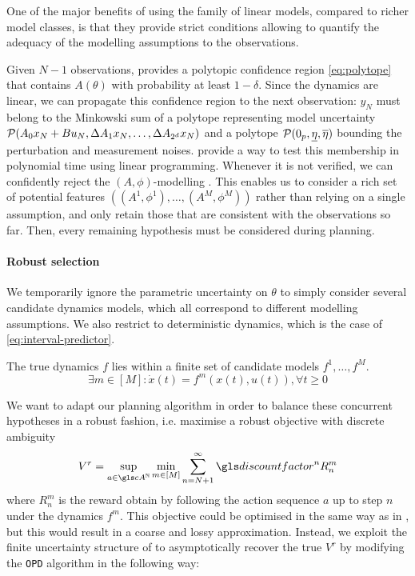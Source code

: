 One of the major benefits of using the family of linear models, compared to richer model classes, is that they provide strict conditions allowing to quantify the adequacy of the modelling assumptions to the observations.

Given $N-1$ observations,  provides a polytopic confidence region \eqref{eq:polytope} that contains $A(\theta)$ with probability at least $1-\delta$. Since the dynamics are linear, we can propagate this confidence region to the next observation: $y_{N}$ must belong to the Minkowski sum of a polytope representing model uncertainty $\mathcal{P}(A_{0} x_N + Bu_N, \Delta A_{1}x_N,\dots, \Delta A_{2^d}x_N)$ and a polytope $\mathcal{P}(0_p, \underline{\eta}, \overline{\eta})$ bounding the perturbation and measurement noises. \citet{delos2015} provide a way to test this membership in polynomial time using linear programming. Whenever it is not verified, we can confidently reject the $(A,\phi)$-modelling . This enables us to consider a rich set of potential features $\left((A^1, \phi^1), \dots, (A^M, \phi^M)\right)$ rather than relying on a single assumption, and only retain those that are consistent with the observations so far. Then, every remaining hypothesis must be considered during planning.

\paragraph{Robust selection}

We temporarily ignore the parametric uncertainty on $\theta$ to simply consider several candidate dynamics models, which all correspond to different modelling assumptions. We also restrict to deterministic dynamics, which is the case of \eqref{eq:interval-predictor}.

\begin{assumption}
	\label{assumpt:multi-model-ambiguity}
	\begin{leftbar}[assumptionbar]
	The true dynamics $f$ lies within a finite set of candidate models $f^1, \dots, f^M$.
	\begin{equation*}
	\exists m\in[M]: \dot{x}(t) = f^m(x(t), u(t)), \forall t\geq 0
	\end{equation*}
	\end{leftbar}
\end{assumption}
We want to adapt our planning algorithm in order to balance these concurrent hypotheses in a robust fashion, i.e. maximise a robust objective with discrete ambiguity
\begin{equation}
\label{eq:robust-objective-discrete}
V^r = \sup_{a\in\cA^\Natural}\min_{m\in[M]} \sum_{n=N+1}^\infty \discount^n R_n^m
\end{equation}
where $R_n^m$ is the reward obtain by following the action sequence $a$ up to step $n$ under the dynamics $f^m$.
This objective could be optimised in the same way as in , but this would result in a coarse and lossy approximation. Instead, we exploit the finite uncertainty structure of  to asymptotically recover the true $V^r$ by modifying the \texttt{OPD} algorithm in the following way:

